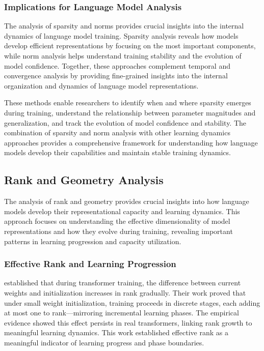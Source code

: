 \subsubsection{Implications for Language Model Analysis}

The analysis of sparsity and norms provides crucial insights into the internal dynamics of language model training. Sparsity analysis reveals how models develop efficient representations by focusing on the most important components, while norm analysis helps understand training stability and the evolution of model confidence. Together, these approaches complement temporal and convergence analysis by providing fine-grained insights into the internal organization and dynamics of language model representations.

These methods enable researchers to identify when and where sparsity emerges during training, understand the relationship between parameter magnitudes and generalization, and track the evolution of model confidence and stability. The combination of sparsity and norm analysis with other learning dynamics approaches provides a comprehensive framework for understanding how language models develop their capabilities and maintain stable training dynamics.

\subsection{Rank and Geometry Analysis}

The analysis of rank and geometry provides crucial insights into how language models develop their representational capacity and learning dynamics. This approach focuses on understanding the effective dimensionality of model representations and how they evolve during training, revealing important patterns in learning progression and capacity utilization.

\subsubsection{Effective Rank and Learning Progression}

\citet{boix-adsera2023rank} established that during transformer training, the difference between current weights and initialization increases in rank gradually. Their work proved that under small weight initialization, training proceeds in discrete stages, each adding at most one to rank—mirroring incremental learning phases. The empirical evidence showed this effect persists in real transformers, linking rank growth to meaningful learning dynamics. This work established effective rank as a meaningful indicator of learning progress and phase boundaries.

